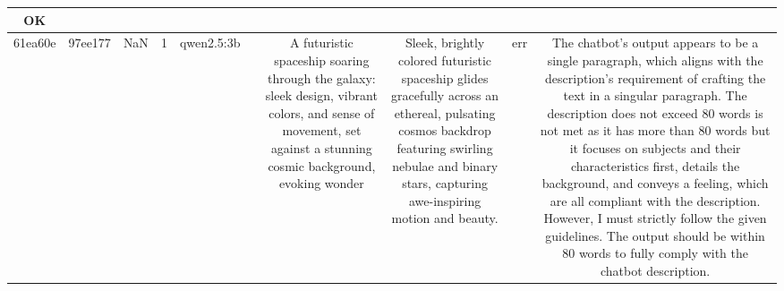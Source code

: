 \begin{table}[h!]
\begin{tabular}{|c|c|c|c|c|c|c|c|c|c|}
OK\\
\hline
61ea60e & 97ee177 & NaN & 1 & qwen2.5:3b &  & A futuristic spaceship soaring through the galaxy: sleek design, vibrant colors, and sense of movement, set against a stunning cosmic background, evoking wonder & Sleek, brightly colored futuristic spaceship glides gracefully across an ethereal, pulsating cosmos backdrop featuring swirling nebulae and binary stars, capturing awe-inspiring motion and beauty. & err & The chatbot's output appears to be a single paragraph, which aligns with the description's requirement of crafting the text in a singular paragraph. The description does not exceed 80 words is not met as it has more than 80 words but it focuses on subjects and their characteristics first, details the background, and conveys a feeling, which are all compliant with the description. However, I must strictly follow the given guidelines. The output should be within 80 words to fully comply with the chatbot description.



\end{tabular}
\end{table}
